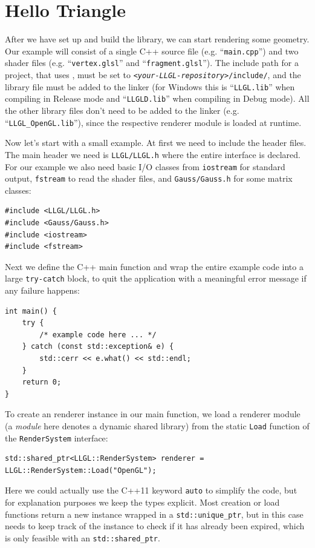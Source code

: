 \documentclass{article}
\begin{document}
\newpage

\section*{Hello Triangle}

After we have set up and build the library, we can start rendering some geometry.
Our example will consist of a single C++ source file (e.g. ``\texttt{main.cpp}'') and two shader files
(e.g. ``\texttt{vertex.glsl}'' and ``\texttt{fragment.glsl}'').
The include path for a project, that uses \LLGL, must be set to \texttt{\textit{<your-LLGL-repository>}/include/},
and the \LLGL library file must be added to the linker (for Windows this is ``\texttt{LLGL.lib}''
when compiling in Release mode and ``\texttt{LLGLD.lib}'' when compiling in Debug mode).
All the other library files don't need to be added to the linker (e.g. ``\texttt{LLGL\_OpenGL.lib}''),
since the respective renderer module is loaded at runtime.

Now let's start with a small example. At first we need to include the header files.
The main header we need is \texttt{LLGL/LLGL.h} where the entire \LLGL interface is declared.
For our example we also need basic I/O classes from \texttt{iostream} for standard output, \texttt{fstream}
to read the shader files, and \texttt{Gauss/Gauss.h} for some matrix classes:
\begin{lstlisting}
#include <LLGL/LLGL.h>
#include <Gauss/Gauss.h>
#include <iostream>
#include <fstream>
\end{lstlisting}

Next we define the C++ main function and wrap the entire example code into a large \texttt{try-catch} block,
to quit the application with a meaningful error message if any failure happens:
\begin{lstlisting}
int main() {
    try {
        /* example code here ... */
    } catch (const std::exception& e) {
        std::cerr << e.what() << std::endl;
    }
    return 0;
}
\end{lstlisting}

To create an \LLGL renderer instance in our main function, we load a renderer module
(a \textit{module} here denotes a dynamic shared library)
from the static \texttt{Load} function of the \texttt{RenderSystem} interface:
\begin{lstlisting}
std::shared_ptr<LLGL::RenderSystem> renderer = LLGL::RenderSystem::Load("OpenGL");
\end{lstlisting}
Here we could actually use the C++11 keyword \texttt{auto} to simplify the code,
but for explanation purposes we keep the types explicit.
Most creation or load functions return a new instance wrapped in a \texttt{std::unique\_ptr},
but in this case \LLGL needs to keep track of the instance to check if it has already been expired,
which is only feasible with an \texttt{std::shared\_ptr}.
\end{document}
